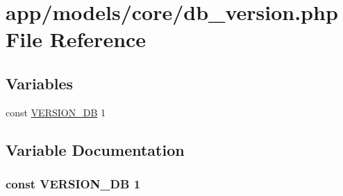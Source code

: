 \hypertarget{db__version_8php}{\section{app/models/core/db\-\_\-version.php File Reference}
\label{db__version_8php}
}
\subsection*{Variables}
\begin{DoxyCompactItemize}
\item 
const \hyperlink{db__version_8php_aabc65496e34f7e9323f3242b31569fd1}{V\-E\-R\-S\-I\-O\-N\-\_\-\-D\-B} 1
\end{DoxyCompactItemize}


\subsection{Variable Documentation}
\hypertarget{db__version_8php_aabc65496e34f7e9323f3242b31569fd1}{
\subsubsection[{V\-E\-R\-S\-I\-O\-N\-\_\-\-D\-B}]{\setlength{\rightskip}{0pt plus 5cm}const V\-E\-R\-S\-I\-O\-N\-\_\-\-D\-B 1}}\label{db__version_8php_aabc65496e34f7e9323f3242b31569fd1}
